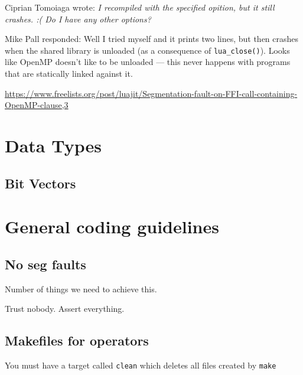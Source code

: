 Ciprian Tomoiaga wrote:
{\it I recompiled with the specified opition, but it still crashes. :(
Do I have any other options? }

Mike Pall responded: 
Well I tried myself and it prints two lines, but then crashes when
the shared library is unloaded (as a consequence of \verb+lua_close()+).
Looks like OpenMP doesn't like to be unloaded --- this never
happens with programs that are statically linked against it.

\url{https://www.freelists.org/post/luajit/Segmentation-fault-on-FFI-call-containing-OpenMP-clause,3}

\section{Data Types}

\subsection{Bit Vectors}

\section{General coding guidelines}
\subsection{No seg faults}
Number of things we need to achieve this. 
\be 
\item  Trust nobody. Assert everything. 
\item \TBC
\ee


\subsection{Makefiles for operators}

\be
\item You must have a target called {\tt clean} which deletes all files created
by {\tt make}
\ee


